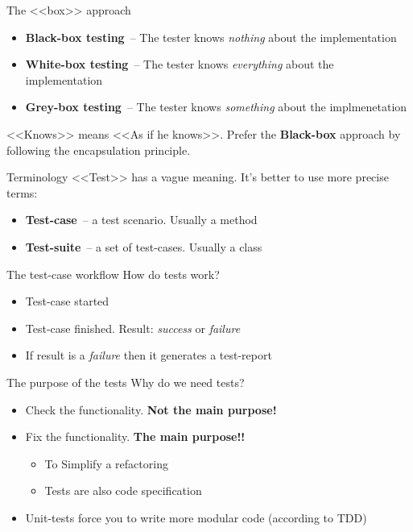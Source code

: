 \documentclass[aspectratio=169]{beamer}
\begin{document}
\begin{frame}{The <<box>> approach}
  \begin{itemize}
    \item \textbf{Black-box testing}~-- The tester knows \textit{nothing} about the implementation
    \item \textbf{White-box testing}~-- The tester knows \textit{everything} about the implementation
    \item \textbf{Grey-box testing}~-- The tester knows \textit{something} about the implmenetation
  \end{itemize}
  \bigskip
  \pause
  <<Knows>> means <<As if he knows>>.
  Prefer the \textbf{Black-box} approach by following the encapsulation principle.
\end{frame}

\begin{frame}{Terminology}
  <<Test>> has a vague meaning. It's better to use more precise terms:
  \begin{itemize}
    \item \textbf{Test-case}~-- a test scenario. Usually a method
    \item \textbf{Test-suite}~-- a set of test-cases. Usually a class
  \end{itemize}
\end{frame}

\begin{frame}{The test-case workflow}
  How do tests work?
  \begin{itemize}
    \item Test-case started
    \item Test-case finished. Result: \textit{success} or \textit{failure}
    \item If result is a \textit{failure} then it generates a test-report
  \end{itemize}
\end{frame}

\begin{frame}{The purpose of the tests}
  Why do we need tests?
  \begin{itemize}
    \item Check the functionality. \textbf{Not the main purpose!}
    \item Fix the functionality. \textbf{The main purpose!!}
      \begin{itemize}
        \item To Simplify a refactoring
        \item Tests are also code specification
      \end{itemize}
    \item Unit-tests force you to write more modular code (according to TDD)
  \end{itemize}
\end{frame}
\end{document}

